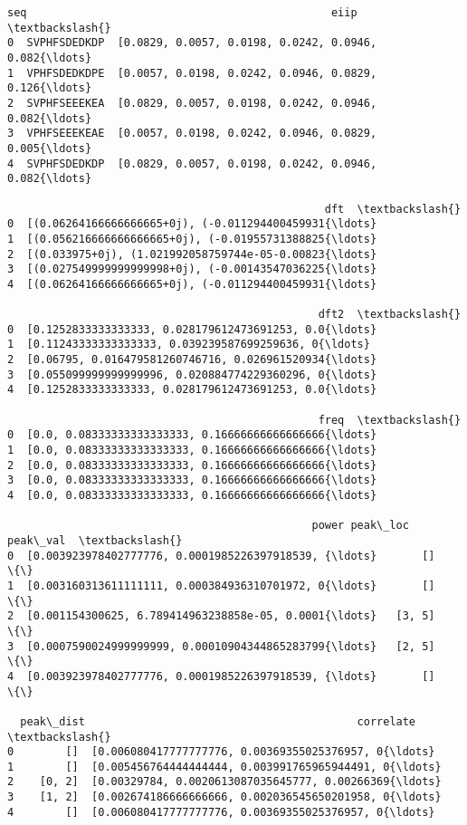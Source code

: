 \documentclass[11pt]{article}
\makeatletter
\newcommand{\boxspacing}{\kern\kvtcb@left@rule\kern\kvtcb@boxsep}
\newcommand{\prompt}[4]{
        \ttfamily\llap{{\color{#2}[#3]:\hspace{3pt}#4}}\vspace{-\baselineskip}
    }
\makeatother
\begin{document}
            \begin{tcolorbox}[breakable, size=fbox, boxrule=.5pt, pad at break*=1mm, opacityfill=0]
\prompt{Out}{outcolor}{123}{\boxspacing}
\begin{Verbatim}[commandchars=\\\{\}]
            seq                                               eiip  \textbackslash{}
0  SVPHFSDEDKDP  [0.0829, 0.0057, 0.0198, 0.0242, 0.0946, 0.082{\ldots}
1  VPHFSDEDKDPE  [0.0057, 0.0198, 0.0242, 0.0946, 0.0829, 0.126{\ldots}
2  SVPHFSEEEKEA  [0.0829, 0.0057, 0.0198, 0.0242, 0.0946, 0.082{\ldots}
3  VPHFSEEEKEAE  [0.0057, 0.0198, 0.0242, 0.0946, 0.0829, 0.005{\ldots}
4  SVPHFSDEDKDP  [0.0829, 0.0057, 0.0198, 0.0242, 0.0946, 0.082{\ldots}

                                                 dft  \textbackslash{}
0  [(0.06264166666666665+0j), (-0.011294400459931{\ldots}
1  [(0.056216666666666665+0j), (-0.01955731388825{\ldots}
2  [(0.033975+0j), (1.021992058759744e-05-0.00823{\ldots}
3  [(0.027549999999999998+0j), (-0.00143547036225{\ldots}
4  [(0.06264166666666665+0j), (-0.011294400459931{\ldots}

                                                dft2  \textbackslash{}
0  [0.1252833333333333, 0.028179612473691253, 0.0{\ldots}
1  [0.11243333333333333, 0.039239587699259636, 0{\ldots}
2  [0.06795, 0.016479581260746716, 0.026961520934{\ldots}
3  [0.055099999999999996, 0.020884774229360296, 0{\ldots}
4  [0.1252833333333333, 0.028179612473691253, 0.0{\ldots}

                                                freq  \textbackslash{}
0  [0.0, 0.08333333333333333, 0.16666666666666666{\ldots}
1  [0.0, 0.08333333333333333, 0.16666666666666666{\ldots}
2  [0.0, 0.08333333333333333, 0.16666666666666666{\ldots}
3  [0.0, 0.08333333333333333, 0.16666666666666666{\ldots}
4  [0.0, 0.08333333333333333, 0.16666666666666666{\ldots}

                                               power peak\_loc peak\_val  \textbackslash{}
0  [0.003923978402777776, 0.0001985226397918539, {\ldots}       []       \{\}
1  [0.003160313611111111, 0.000384936310701972, 0{\ldots}       []       \{\}
2  [0.001154300625, 6.789414963238858e-05, 0.0001{\ldots}   [3, 5]       \{\}
3  [0.0007590024999999999, 0.00010904344865283799{\ldots}   [2, 5]       \{\}
4  [0.003923978402777776, 0.0001985226397918539, {\ldots}       []       \{\}

  peak\_dist                                          correlate  \textbackslash{}
0        []  [0.006080417777777776, 0.00369355025376957, 0{\ldots}
1        []  [0.005456764444444444, 0.003991765965944491, 0{\ldots}
2    [0, 2]  [0.00329784, 0.0020613087035645777, 0.00266369{\ldots}
3    [1, 2]  [0.002674186666666666, 0.002036545650201958, 0{\ldots}
4        []  [0.006080417777777776, 0.00369355025376957, 0{\ldots}


\end{Verbatim}
\end{tcolorbox}
\end{document}
